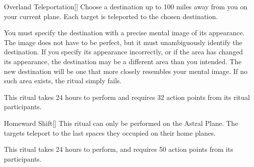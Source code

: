 \lowercase{\hypertarget{spell:Overland Teleportation}{}}\label{spell:Overland Teleportation}
\begin{apability}[Rank 5]{\hypertarget{spell:Overland Teleportation}{Overland Teleportation}}[]
Choose a destination up to 100 miles away from you on your current plane.
Each target is teleported to the chosen destination.

You must specify the destination with a precise mental image of its appearance.
The image does not have to be perfect, but it must unambiguously identify the destination.
If you specify its appearance incorrectly, or if the area has changed its appearance, the destination may be a different area than you intended.
The new destination will be one that more closely resembles your mental image.
If no such area exists, the ritual simply fails.

This ritual takes 24 hours to perform and requires 32 action points from its ritual participants.
\end{apability}
\vspace{0.25em}



\lowercase{\hypertarget{spell:Homeward Shift}{}}\label{spell:Homeward Shift}
\begin{apability}[Rank 6]{\hypertarget{spell:Homeward Shift}{Homeward Shift}}[]
This ritual can only be performed on the Astral Plane.
The targets teleport to the last spaces they occupied on their home planes.

This ritual takes 24 hours to perform, and requires 50 action points from its participants.
\end{apability}
\vspace{0.25em}



